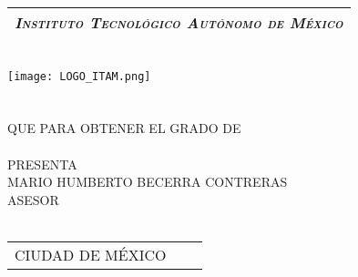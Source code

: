 
\thispagestyle{empty}
\begin{titlepage}

	\begin{center}
	\vspace{70pt}
		\begin{tabular}{c}
			\Large \emph{\textsc{Instituto Tecnológico Autónomo de México}}\\
			\hline
		\end{tabular}\\
		\vspace{25pt}
		\texttt{[image: LOGO\_ITAM.png]}\\
		\vspace{25pt}
		{\huge \thetitle}\\
		\vspace{5pt}
		\vspace{20 pt}
		{\Large \thethesis } \\
		\vspace{5pt}
		QUE PARA OBTENER EL GRADO DE \\
		\vspace{5pt}
		{\Large \thedegree} \\
		\vspace{5pt}
		PRESENTA \\
		\vspace{5pt}
		{\Large MARIO HUMBERTO BECERRA CONTRERAS} \\
		\vfill
		ASESOR \\
		{\Large \theadvisor} \\
		\vspace{5pt}
		\begin{tabular}{lcr}
			CIUDAD DE MÉXICO & \hspace{60pt} & \theyear
		\end{tabular}
	\end{center}
\end{titlepage}
